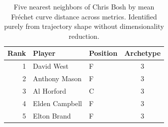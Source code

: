 \begin{table}[htbp]
  \centering\small
  \begin{tabular}{rllc}
    \toprule
    Rank & Player & Position & Archetype \\
    \midrule
    1 & David West & F & 3 \\
    2 & Anthony Mason & F & 3 \\
    3 & Al Horford & C & 3 \\
    4 & Elden Campbell & F & 3 \\
    5 & Elton Brand & F & 3 \\
    \bottomrule
  \end{tabular}
  \caption{Five nearest neighbors of Chris Bosh by mean Fr\'{e}chet curve distance across metrics. Identified purely from trajectory shape without dimensionality reduction.}
  \label{tab:Chris_Bosh_frechet_curve_neighbors}
\end{table}

